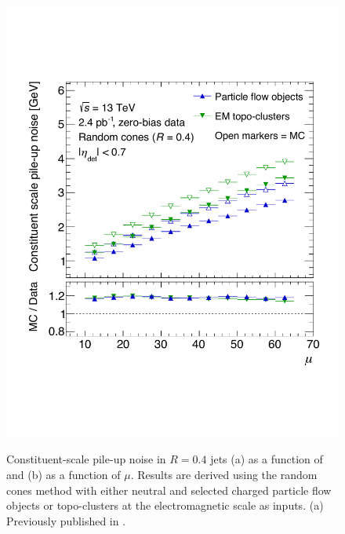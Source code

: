 \begin{figure}[t]
{{            \includegraphics[trim=35 120 0 120]{figures/calibration/const-noise-vs-mu-new.pdf}
        }
    }
    \caption[Constituent-scale pile-up noise.]{Constituent-scale pile-up noise in \antikt $R=0.4$ jets (a) as a function of \absetadet and (b) as a function of $\mu$. Results are derived using the random cones method with either neutral and selected charged particle flow objects or topo-clusters at the electromagnetic scale as inputs. (a)
        Previously published in .}
    \label{fig:const-scale-noise-results}
\end{figure}



